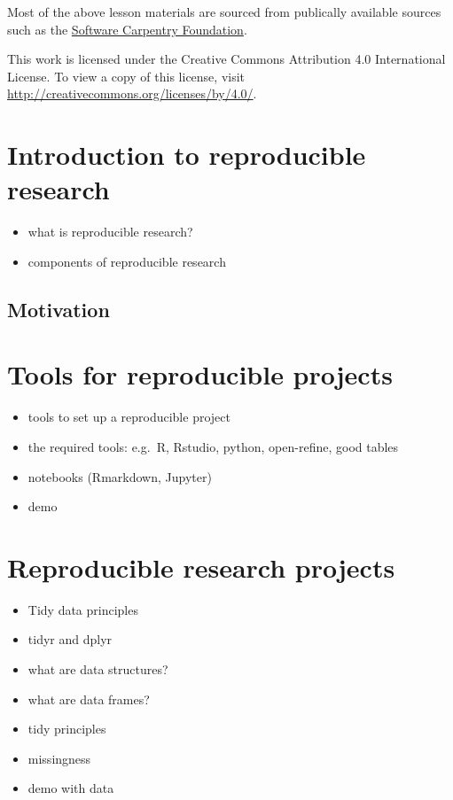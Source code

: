 \documentclass[]{book}
\providecommand{\tightlist}{%
  \setlength{\itemsep}{0pt}\setlength{\parskip}{0pt}}
\begin{document}
Most of the above lesson materials are sourced from publically available sources such as the \href{https://software-carpentry.org/lessons/index.html}{Software Carpentry Foundation}.

This work is licensed under the Creative Commons Attribution 4.0 International License.
To view a copy of this license, visit \url{http://creativecommons.org/licenses/by/4.0/}.

\hypertarget{introduction-to-reproducible-research}{%
\chapter{Introduction to reproducible research}\label{introduction-to-reproducible-research}}

\begin{itemize}
\tightlist
\item
  what is reproducible research?
\item
  components of reproducible research
\end{itemize}

\hypertarget{motivation}{%
\section{Motivation}\label{motivation}}

\hypertarget{tools-for-reproducible-projects}{%
\chapter{Tools for reproducible projects}\label{tools-for-reproducible-projects}}

\begin{itemize}
\item
  tools to set up a reproducible project
\item
  the required tools: e.g.~R, Rstudio, python, open-refine, good tables
\item
  notebooks (Rmarkdown, Jupyter)
\item
  demo
\end{itemize}

\hypertarget{reproducible-research-projects}{%
\chapter{Reproducible research projects}\label{reproducible-research-projects}}

\begin{itemize}
\item
  Tidy data principles
\item
  tidyr and dplyr
\item
  what are data structures?
\item
  what are data frames?
\item
  tidy principles
\item
  missingness
\item
  demo with data
\end{itemize}
\end{document}
